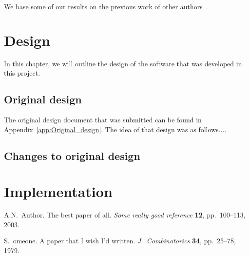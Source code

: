 \documentclass[a4paper,11pt]{report}
\begin{document}
We base some of our results on the previous work of other authors~\cite{A1, Someone}.



\chapter{Design}\label{chap:design}

In this chapter, we will outline the design of the software that was
developed in this project.  

\section{Original design}\label{chap:first_design}
The original design document that was submitted can be found in 
Appendix~\ref{app:Original_design}.  The idea of that design
was as follows....


\section{Changes to original design}



\chapter{Implementation}\label{chap:implementation}








\begin{thebibliography}{99}

A.N.~Author.  The best paper of all.
{\em Some really good reference} {\bf 12}, pp.~100--113, 2003.

S.~omeone.  A paper that I wish I'd written.  
{\em J.\ Combinatorics} {\bf 34}, pp.~25--78, 1979.  

\end{thebibliography}
\end{document}
